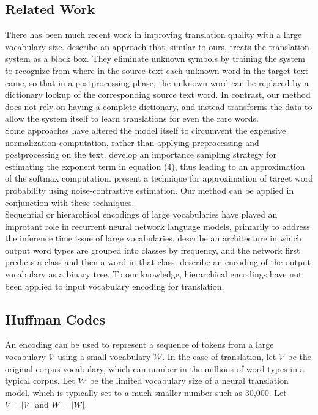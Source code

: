 \subsection{Related Work}
There has been much recent work in improving translation quality with a large vocabulary size.
 describe an approach
that, similar to ours, treats the translation system as a black box. They eliminate unknown symbols by training the
system to recognize from where in the source text each unknown word in the target text came, so that in a postprocessing
 phase, the unknown word can be replaced by a dictionary lookup of the corresponding source text word. In contrast,
our method does not rely on having a complete dictionary, and instead transforms the data to allow the system itself to
learn translations for even the rare words.\\

Some approaches have altered the model itself to circumvent the expensive normalization computation, rather than
applying preprocessing and postprocessing on the text. 
develop an importance sampling strategy for estimating the exponent term in equation (4), thus leading to
an approximation of the softmax computation. 
present a technique for approximation of target word probability using noise-contrastive estimation. Our method can
be applied in conjunction with these techniques.\\

Sequential or hierarchical encodings of large vocabularies have played an
improtant role in recurrent neural network language models, primarily to
address the inference time issue of large vocabularies. 
describe an architecture in which output word types are grouped into classes by
frequency, and the network first predicts a class and then a word in that
class.  describe an encoding of the output
vocabulary as a binary tree. To our knowledge, hierarchical encodings have not
been applied to input vocabulary encoding for translation.

\subsection{Huffman Codes}

An encoding can be used to represent a sequence of tokens from a large
vocabulary $\mathcal{V}$ using a small vocabulary $\mathcal{W}$.  In the case
of translation, let $\mathcal{V}$ be the original corpus vocabulary, which can
number in the millions of word types in a typical corpus. Let $\mathcal{W}$ be
the limited vocabulary size of a neural translation model, which is typically
set to a much smaller number such as 30,000. Let $V=|\mathcal{V}|$ and
$W=|\mathcal{W}|$.

